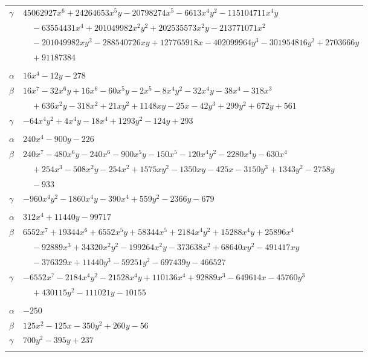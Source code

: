\documentclass[11pt]{article}
\begin{document}
\begin{longtable}{@{}ll@{}}
$\gamma$ & $45062927x^{6}+24264653x^{5}y-20798274x^{5}-6613x^{4}y^{2}-115104711x^{4}y$\\
 & $\quad -63554431x^{4}+201049982x^{2}y^{2}+202535573x^{2}y-213771071x^{2}$\\
 & $\quad -201049982xy^{2}-288540726xy+127765918x-402099964y^{3}-301954816y^{2}+2703666y$\\
 & $\quad +91187384$\\
\addlinespace[3pt]
\multicolumn{2}{@{}l}{$\{i,j\}=\{14,19\}$, $k_{ij}=2^{6}\cdot 3^{2}$}\\
$\alpha$ & $16x^{4}-12y-278$\\
$\beta$ & $16x^{7}-32x^{6}y+16x^{6}-60x^{5}y-2x^{5}-8x^{4}y^{2}-32x^{4}y-38x^{4}-318x^{3}$\\
 & $\quad +636x^{2}y-318x^{2}+21xy^{2}+1148xy-25x-42y^{3}+299y^{2}+672y+561$\\
$\gamma$ & $-64x^{4}y^{2}+4x^{4}y-18x^{4}+1293y^{2}-124y+293$\\
\addlinespace[3pt]
\multicolumn{2}{@{}l}{$\{i,j\}=\{15,19\}$, $k_{ij}=2^{2}\cdot 7$}\\
$\alpha$ & $240x^{4}-900y-226$\\
$\beta$ & $240x^{7}-480x^{6}y-240x^{6}-900x^{5}y-150x^{5}-120x^{4}y^{2}-2280x^{4}y-630x^{4}$\\
 & $\quad +254x^{3}-508x^{2}y-254x^{2}+1575xy^{2}-1350xy-425x-3150y^{3}+1343y^{2}-2758y$\\
 & $\quad -933$\\
$\gamma$ & $-960x^{4}y^{2}-1860x^{4}y-390x^{4}+559y^{2}-2366y-679$\\
\addlinespace[3pt]
\multicolumn{2}{@{}l}{$\{i,j\}=\{16,20\}$, $k_{ij}=2^{2}\cdot 3^{2}\cdot 5^{3}\cdot 7\cdot 11$}\\
$\alpha$ & $312x^{4}+11440y-99717$\\
$\beta$ & $6552x^{7}+19344x^{6}+6552x^{5}y+58344x^{5}+2184x^{4}y^{2}+15288x^{4}y+25896x^{4}$\\
 & $\quad -92889x^{3}+34320x^{2}y^{2}-199264x^{2}y-373638x^{2}+68640xy^{2}-491417xy$\\
 & $\quad -376329x+11440y^{3}-59251y^{2}-697439y-466527$\\
$\gamma$ & $-6552x^{7}-2184x^{4}y^{2}-21528x^{4}y+110136x^{4}+92889x^{3}-649614x-45760y^{3}$\\
 & $\quad +430115y^{2}-111021y-10155$\\
\addlinespace[3pt]
\multicolumn{2}{@{}l}{$\{i,j\}=\{18,20\}$, $k_{ij}=2^{3}\cdot 3\cdot 7$}\\
$\alpha$ & $-250$\\
$\beta$ & $125x^{2}-125x-350y^{2}+260y-56$\\
$\gamma$ & $700y^{2}-395y+237$\\
\addlinespace[3pt]
\end{longtable}
\endgroup
\end{document}
